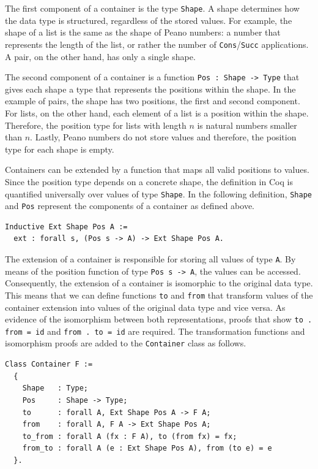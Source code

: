 \documentclass[a4paper, 11pt, fleqn, twoside]{scrreprt}
\newcommand{\hinl}[1]{\texttt{#1}}
\newcommand{\cinl}[1]{\texttt{#1}}
\begin{document}
The first component of a container is the type \texttt{Shape}.
A shape determines how the data type is structured, regardless of the stored values.
For example, the  shape of a list is the same as the shape of Peano numbers: a number that  represents the length of the list, or rather the number of \cinl{Cons}/\cinl{Succ} applications.
A pair, on the other hand, has only a single shape.

The second component of a container is a function \cinl{Pos : Shape -> Type} that gives each shape a type that represents the positions within the shape.
In the example of pairs, the shape has two positions, the first and second component.
For lists, on the other hand, each element of a list is a position within the shape.
Therefore, the position type for lists with length $n$ is natural numbers smaller than $n$.
Lastly, Peano numbers do not store values and therefore, the position type for each shape is empty.

Containers can be extended by a function that maps all valid positions to values.
Since the position type depends on a concrete shape, the definition in Coq is quantified universally over values of type \cinl{Shape}.
In the following definition, \cinl{Shape} and \cinl{Pos} represent the components of a container as defined above.

\begin{verbatim}
Inductive Ext Shape Pos A := 
  ext : forall s, (Pos s -> A) -> Ext Shape Pos A.
\end{verbatim}

The extension of a container is responsible for storing all values of type \cinl{A}.
By means of the position function of type \cinl{Pos s -> A}, the values can be accessed.
Consequently, the extension of a container is isomorphic to the original data type.
This means that we can define functions \cinl{to} and \cinl{from} that transform values of the container extension into values of the original data type and vice versa.
As evidence of the isomorphism between both representations, proofs that show \cinl{to . from = id} and \hinl{from . to = id} are required.
The transformation functions and isomorphism proofs are added to the \cinl{Container} class as follows.

\begin{verbatim}
Class Container F :=
  {
    Shape   : Type;
    Pos     : Shape -> Type;
    to      : forall A, Ext Shape Pos A -> F A;
    from    : forall A, F A -> Ext Shape Pos A;
    to_from : forall A (fx : F A), to (from fx) = fx;
    from_to : forall A (e : Ext Shape Pos A), from (to e) = e
  }.
\end{verbatim}
\end{document}
